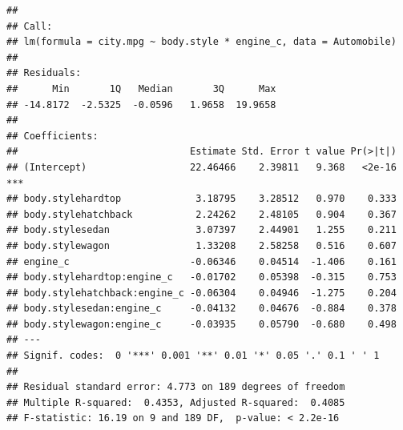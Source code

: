 \documentclass[]{article}
\newenvironment{Shaded}{\begin{snugshade}}{\end{snugshade}}
\newcommand{\KeywordTok}[1]{\textcolor[rgb]{0.13,0.29,0.53}{\textbf{#1}}}
\newcommand{\DataTypeTok}[1]{\textcolor[rgb]{0.13,0.29,0.53}{#1}}
\newcommand{\StringTok}[1]{\textcolor[rgb]{0.31,0.60,0.02}{#1}}
\newcommand{\OperatorTok}[1]{\textcolor[rgb]{0.81,0.36,0.00}{\textbf{#1}}}
\newcommand{\NormalTok}[1]{#1}
\begin{document}
\begin{Shaded}
\end{Shaded}

\begin{verbatim}
## 
## Call:
## lm(formula = city.mpg ~ body.style * engine_c, data = Automobile)
## 
## Residuals:
##      Min       1Q   Median       3Q      Max 
## -14.8172  -2.5325  -0.0596   1.9658  19.9658 
## 
## Coefficients:
##                              Estimate Std. Error t value Pr(>|t|)    
## (Intercept)                  22.46466    2.39811   9.368   <2e-16 ***
## body.stylehardtop             3.18795    3.28512   0.970    0.333    
## body.stylehatchback           2.24262    2.48105   0.904    0.367    
## body.stylesedan               3.07397    2.44901   1.255    0.211    
## body.stylewagon               1.33208    2.58258   0.516    0.607    
## engine_c                     -0.06346    0.04514  -1.406    0.161    
## body.stylehardtop:engine_c   -0.01702    0.05398  -0.315    0.753    
## body.stylehatchback:engine_c -0.06304    0.04946  -1.275    0.204    
## body.stylesedan:engine_c     -0.04132    0.04676  -0.884    0.378    
## body.stylewagon:engine_c     -0.03935    0.05790  -0.680    0.498    
## ---
## Signif. codes:  0 '***' 0.001 '**' 0.01 '*' 0.05 '.' 0.1 ' ' 1
## 
## Residual standard error: 4.773 on 189 degrees of freedom
## Multiple R-squared:  0.4353, Adjusted R-squared:  0.4085 
## F-statistic: 16.19 on 9 and 189 DF,  p-value: < 2.2e-16
\end{verbatim}

\begin{Shaded}
\end{Shaded}
\end{document}
